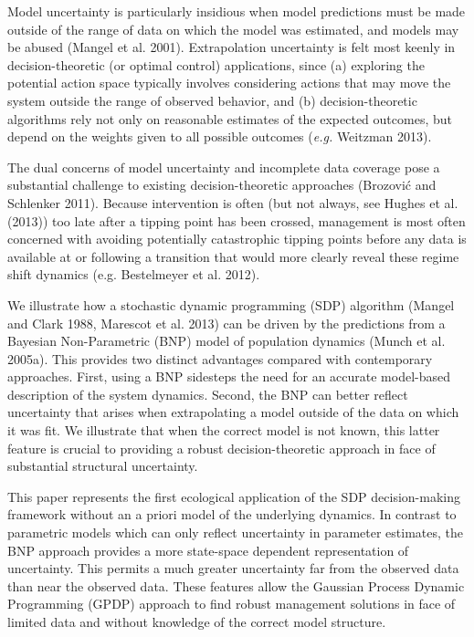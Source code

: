 \documentclass[]{components/elsarticle}
\begin{document}
Model uncertainty is particularly insidious when model predictions must
be made outside of the range of data on which the model was estimated,
and models may be abused (Mangel et al. 2001). Extrapolation uncertainty
is felt most keenly in decision-theoretic (or optimal control)
applications, since (a) exploring the potential action space typically
involves considering actions that may move the system outside the range
of observed behavior, and (b) decision-theoretic algorithms rely not
only on reasonable estimates of the expected outcomes, but depend on the
weights given to all possible outcomes (\emph{e.g.} Weitzman 2013).

The dual concerns of model uncertainty and incomplete data coverage pose
a substantial challenge to existing decision-theoretic approaches
(Brozović and Schlenker 2011). Because intervention is often (but not
always, see Hughes et al. (2013)) too late after a tipping point has
been crossed, management is most often concerned with avoiding
potentially catastrophic tipping points before any data is available at
or following a transition that would more clearly reveal these regime
shift dynamics (e.g. Bestelmeyer et al. 2012).

We illustrate how a stochastic dynamic programming (SDP) algorithm
(Mangel and Clark 1988, Marescot et al. 2013) can be driven by the
predictions from a Bayesian Non-Parametric (BNP) model of population
dynamics (Munch et al. 2005a). This provides two distinct advantages
compared with contemporary approaches. First, using a BNP sidesteps the
need for an accurate model-based description of the system dynamics.
Second, the BNP can better reflect uncertainty that arises when
extrapolating a model outside of the data on which it was fit. We
illustrate that when the correct model is not known, this latter feature
is crucial to providing a robust decision-theoretic approach in face of
substantial structural uncertainty.

This paper represents the first ecological application of the SDP
decision-making framework without an a priori model of the underlying
dynamics. In contrast to parametric models which can only reflect
uncertainty in parameter estimates, the BNP approach provides a more
state-space dependent representation of uncertainty. This permits a much
greater uncertainty far from the observed data than near the observed
data. These features allow the Gaussian Process Dynamic Programming
(GPDP) approach to find robust management solutions in face of limited
data and without knowledge of the correct model structure.
\end{document}
